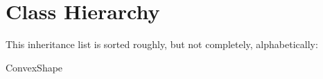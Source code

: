 \section{Class Hierarchy}
This inheritance list is sorted roughly, but not completely, alphabetically\+:\begin{DoxyCompactList}
\item Convex\+Shape\begin{DoxyCompactList}
\item {}
\begin{DoxyCompactList}
\item {}
\end{DoxyCompactList}
\end{DoxyCompactList}
\item {}
\item {}
\end{DoxyCompactList}
